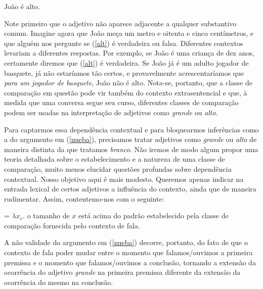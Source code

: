 \begin{exe}
\ex João é alto.\label{alt}
\end{exe}

\n Note primeiro que o adjetivo não aparece adjacente a qualquer substantivo comum. Imagine agora que João meça um metro e oitenta e cinco
centímetros, e que alguém nos pergunte se (\ref{alt}) é verdadeira
ou falsa. Diferentes contextos levariam a diferentes respostas.
Por exemplo, se João é uma criança de dez anos, certamente diremos
que (\ref{alt}) é verdadeira. Se João já é um adulto jogador de
basquete, já não estaríamos tão certos, e provavelmente
acrescentaríamos que \textit{para um jogador de basquete}, João não
é alto. Nota-se, portanto, que a classe de comparação em
questão pode vir também do contexto extrasentencial e que, à
medida que uma conversa segue seu curso, diferentes classes de
comparação podem ser usadas na interpretação de adjetivos como
\textit{grande} ou \textit{alto}.

Para captarmos essa dependência contextual e para bloquearmos
inferências como a do argumento em (\ref{nueba}), precisamos tratar adjetivos
como \textit{grande} ou \textit{alto} de maneira distinta da que
tratamos \textit{branco}. Não iremos
de modo algum propor uma teoria detalhada sobre o estabelecimento
e a natureza de uma classe de comparação, muito menos elucidar
questões profundas sobre dependência contextual. Nosso objetivo
aqui é mais modesto. Queremos apenas indicar na entrada lexical de
certos adjetivos a influência do contexto, ainda que de maneira
rudimentar. Assim, contentemo-nos com o seguinte:

\begin{exe}
	\ex {} = $\lambda x_{e}.$ o tamanho de $x$ está acima do padrão estabelecido pela classe de comparação fornecida pelo contexto de fala.
\end{exe}

\n A não validade do argumento em (\ref{nueba}) decorre, portanto, do fato de
que o contexto de fala poder mudar entre o momento que falamos/ouvimos a
primeira premissa e o momento que falamos/ouvimos a conclusão,
tornando a extensão da ocorrência do adjetivo \textit{grande} na
primeira premissa diferente da extensão da ocorrência do mesmo na
conclusão.

